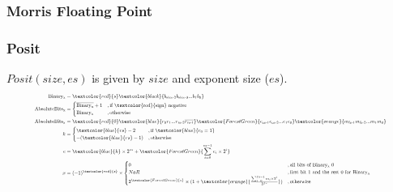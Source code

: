 \begin{frame}
    \frametitle{Morris Floating Point}
\end{frame}


\begin{frame}
    \frametitle{Posit}
    $Posit(size, es)$ is given by $size$ and exponent size ($es$).
    \begin{equation}
        \resizebox{0.9\textwidth}{!}{%
        $
        \begin{aligned}
            \text{Binary}\textsubscript{x}&=\textcolor{red}{s}\textcolor{black}{b\textsubscript{size-2}b\textsubscript{size-3}...b\textsubscript{1}b\textsubscript{0}}\\
            \text{AbsoluteBits}\textsubscript{x}&=\begin{cases}
                \overline{\text{Binary}\textsubscript{x}} + 1 &, \text{if \textcolor{red}{sign} negative}\\
                 \text{Binary}\textsubscript{x} &, \text{otherwise}
            \end{cases}\\
            \text{AbsoluteBits}\textsubscript{x}&=\textcolor{red}{0}\textcolor{blue}{r\textsubscript{0}r\textsubscript{1}...r\textsubscript{rs-2}\overline{r\textsubscript{rs-1}}}\textcolor{ForestGreen}{e\textsubscript{es-1}e\textsubscript{es-2}...e\textsubscript{1}e\textsubscript{0}}\textcolor{orange}{m\textsubscript{fs-1}m\textsubscript{fs-2}...m\textsubscript{1}m\textsubscript{0}}\\
            k&=\begin{cases}
                \textcolor{blue}{rs}-2 &, \text{if } \textcolor{blue}{r_0=1}\\
                -(\textcolor{blue}{rs}-1) &, \text{otherwise}
            \end{cases}\\
            e&=\textcolor{blue}{k} \times 2^{es} + \textcolor{ForestGreen}{\sum_{i=0}^{es-1} e_i \times 2^{i}}\\
            x&=(-1)^{\textcolor{red}{s}} \times \begin{cases}
                    0 &, \text{all bits of \text{Binary}\textsubscript{x} $0$}\\
                    NaR &, \text{first bit $1$ and the rest $0$ for \text{Binary}\textsubscript{x}}\\
                    2^{\textcolor{ForestGreen}{e}} \times (1 + \textcolor{orange}{\frac{\sum_{i=0}^{fs-1} m_i \times 2^i}{2^{fs}}}) &, \text{otherwise}
            \end{cases}
        \end{aligned}$%
        }
    \end{equation}
\end{frame}


